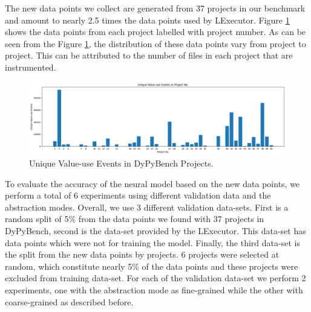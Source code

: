 The new data points we collect are generated from 37 projects in our benchmark and amount to nearly 2.5 times the data points used by LExecutor.
Figure \ref{fig:Lex_projects_events} shows the data points from each project labelled with project number.
As can be seen from the Figure \ref{fig:Lex_projects_events}, the distribution of these data points vary from project to project.
This can be attributed to the number of files in each project that are instrumented. 
\begin{figure}[ht]
    \centering
    \includegraphics[width=1\linewidth]{figures/evaluation/lex_data_points.png}
    \caption[Unique Value-use Events]{\label{fig:Lex_projects_events}Unique Value-use Events in DyPyBench Projects.}
\end{figure}

To evaluate the accuracy of the neural model based on the new data points, we perform a total of 6 experiments using different validation data and the abstraction modes.
Overall, we use 3 different validation data-sets.
First is a random split of 5\% from the data points we found with 37 projects in DyPyBench, second is the data-set provided by the LExecutor. This data-set has data points which were not for training the model.
Finally, the third data-set is the split from the new data points by projects. 6 projects were selected at random, which constitute nearly 5\% of the data points and these projects were excluded from 
training data-set.
For each of the validation data-set we perform 2 experiments, one with the abstraction mode as fine-grained while the other with coarse-grained as described before.

